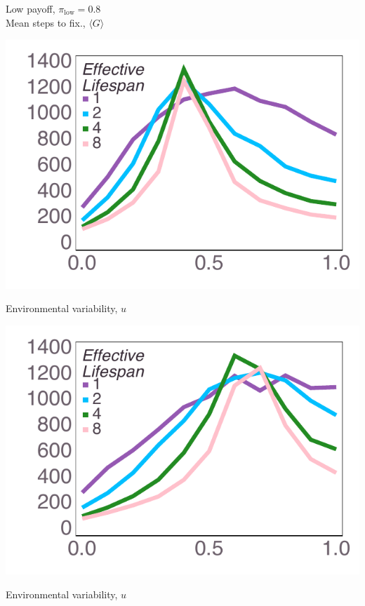 \documentclass[varwidth=true,crop=false]{standalone}
\newcommand{\pisub}[1]{\pi_{\mathrm{#1}}}
\newcommand{\pilow}{\pisub{low}}
\newcommand{\meanvar}[1]{\langle #1 \rangle}
\newcommand{\meanG}{\meanvar{G}}
\begin{document}
    \begin{minipage}{3.75in}
    \begin{rotate}{90}
      {\parbox{3.0in}{
          \centering
          \vspace{-1.0em}\hspace{-2.5em} {\huge Low payoff, $\pilow = 0.8$} \\[1em]
          {\huge Mean steps to fix., $\meanG$}
      }}
    \end{rotate}%
    \hspace{2em}
      \includegraphics[width=\textwidth]{Figures/step_over_u_lowpayoff=0.8_nbehaviors=2.pdf}
        \\[-2.75em]
        \begin{center}
          {\hspace{3.25em} \huge Environmental variability, $u$}
      \end{center}
	  \end{minipage}\noindent\hspace{1.25em}
		\begin{minipage}{3.75in}%
		  \includegraphics[width=\textwidth]{Figures/step_over_u_lowpayoff=0.8_nbehaviors=4.pdf}
		  \\[-2.75em]
	  \begin{center}
          {\hspace{3.25em} \huge Environmental variability, $u$}
      \end{center}
    \end{minipage}
\end{document}
